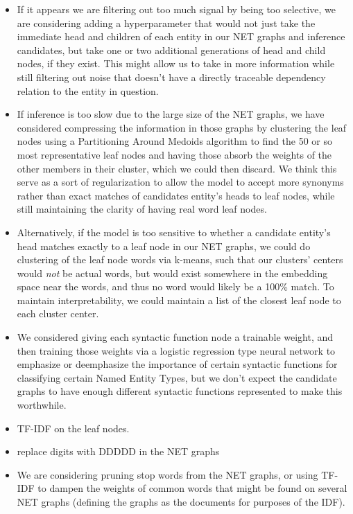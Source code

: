 \documentclass[11pt,a4paper]{article}
\begin{document}
\begin{itemize}

\item If it appears we are filtering out too much signal by being too selective, we are considering adding a hyperparameter that would not just take the immediate head and children of each entity in our NET graphs and inference candidates, but take one or two additional generations of head and child nodes, if they exist. This might allow us to take in more information while still filtering out noise that doesn't have a directly traceable dependency relation to the entity in question.

\item If inference is too slow due to the large size of the NET graphs, we have considered compressing the information in those graphs by clustering the leaf nodes using a Partitioning Around Medoids algorithm to find the 50 or so most representative leaf nodes and having those absorb the weights of the other members in their cluster, which we could then discard. We think this serve as a sort of regularization to allow the model to accept more synonyms rather than exact matches of candidates entity's heads to leaf nodes, while still maintaining the clarity of having real word leaf nodes.

\item Alternatively, if the model is too sensitive to whether a candidate entity's head matches exactly to a leaf node in our NET graphs, we could do clustering of the leaf node words via k-means, such that our clusters' centers would \textit{not} be actual words, but would exist somewhere in the embedding space near the words, and thus no word would likely be a 100\% match. To maintain interpretability, we could maintain a list of the closest leaf node to each cluster center.

\item We considered giving each syntactic function node a trainable weight, and then training those weights via a logistic regression type neural network to emphasize or deemphasize the importance of certain syntactic functions for classifying certain Named Entity Types, but we don't expect the candidate graphs to have enough different syntactic functions represented to make this worthwhile.

\item TF-IDF on the leaf nodes.

\item replace digits with DDDDD in the NET graphs

\item We are considering pruning stop words from the NET graphs, or using TF-IDF to dampen the weights of common words that might be found on several NET graphs (defining the graphs as the documents for purposes of the IDF).

\end{itemize}
\end{document}
